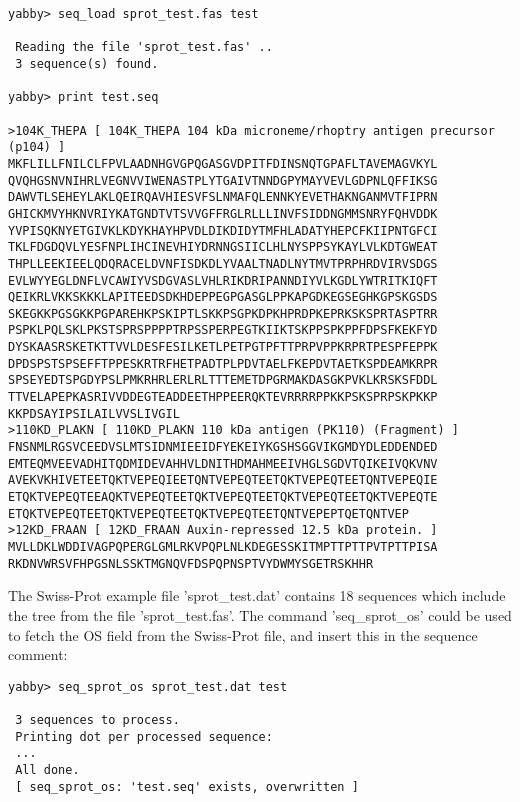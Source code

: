 \begin{verbatim}
yabby> seq_load sprot_test.fas test 

 Reading the file 'sprot_test.fas' ..
 3 sequence(s) found.

yabby> print test.seq

>104K_THEPA [ 104K_THEPA 104 kDa microneme/rhoptry antigen precursor (p104) ]
MKFLILLFNILCLFPVLAADNHGVGPQGASGVDPITFDINSNQTGPAFLTAVEMAGVKYL
QVQHGSNVNIHRLVEGNVVIWENASTPLYTGAIVTNNDGPYMAYVEVLGDPNLQFFIKSG
DAWVTLSEHEYLAKLQEIRQAVHIESVFSLNMAFQLENNKYEVETHAKNGANMVTFIPRN
GHICKMVYHKNVRIYKATGNDTVTSVVGFFRGLRLLLINVFSIDDNGMMSNRYFQHVDDK
YVPISQKNYETGIVKLKDYKHAYHPVDLDIKDIDYTMFHLADATYHEPCFKIIPNTGFCI
TKLFDGDQVLYESFNPLIHCINEVHIYDRNNGSIICLHLNYSPPSYKAYLVLKDTGWEAT
THPLLEEKIEELQDQRACELDVNFISDKDLYVAALTNADLNYTMVTPRPHRDVIRVSDGS
EVLWYYEGLDNFLVCAWIYVSDGVASLVHLRIKDRIPANNDIYVLKGDLYWTRITKIQFT
QEIKRLVKKSKKKLAPITEEDSDKHDEPPEGPGASGLPPKAPGDKEGSEGHKGPSKGSDS
SKEGKKPGSGKKPGPAREHKPSKIPTLSKKPSGPKDPKHPRDPKEPRKSKSPRTASPTRR
PSPKLPQLSKLPKSTSPRSPPPPTRPSSPERPEGTKIIKTSKPPSPKPPFDPSFKEKFYD
DYSKAASRSKETKTTVVLDESFESILKETLPETPGTPFTTPRPVPPKRPRTPESPFEPPK
DPDSPSTSPSEFFTPPESKRTRFHETPADTPLPDVTAELFKEPDVTAETKSPDEAMKRPR
SPSEYEDTSPGDYPSLPMKRHRLERLRLTTTEMETDPGRMAKDASGKPVKLKRSKSFDDL
TTVELAPEPKASRIVVDDEGTEADDEETHPPEERQKTEVRRRRPPKKPSKSPRPSKPKKP
KKPDSAYIPSILAILVVSLIVGIL
>110KD_PLAKN [ 110KD_PLAKN 110 kDa antigen (PK110) (Fragment) ]
FNSNMLRGSVCEEDVSLMTSIDNMIEEIDFYEKEIYKGSHSGGVIKGMDYDLEDDENDED
EMTEQMVEEVADHITQDMIDEVAHHVLDNITHDMAHMEEIVHGLSGDVTQIKEIVQKVNV
AVEKVKHIVETEETQKTVEPEQIEETQNTVEPEQTEETQKTVEPEQTEETQNTVEPEQIE
ETQKTVEPEQTEEAQKTVEPEQTEETQKTVEPEQTEETQKTVEPEQTEETQKTVEPEQTE
ETQKTVEPEQTEETQKTVEPEQTEETQKTVEPEQTEETQNTVEPEPTQETQNTVEP
>12KD_FRAAN [ 12KD_FRAAN Auxin-repressed 12.5 kDa protein. ]
MVLLDKLWDDIVAGPQPERGLGMLRKVPQPLNLKDEGESSKITMPTTPTTPVTPTTPISA
RKDNVWRSVFHPGSNLSSKTMGNQVFDSPQPNSPTVYDWMYSGETRSKHHR
\end{verbatim}

The Swiss-Prot example file 'sprot\_test.dat' contains 18
sequences which include the tree from the file 'sprot\_test.fas'.
The command 'seq\_sprot\_os' could be used to fetch the OS
field from the  Swiss-Prot file, and insert this in the
sequence comment:

\begin{verbatim}
yabby> seq_sprot_os sprot_test.dat test

 3 sequences to process.
 Printing dot per processed sequence:
 ...
 All done.
 [ seq_sprot_os: 'test.seq' exists, overwritten ]
\end{verbatim}

